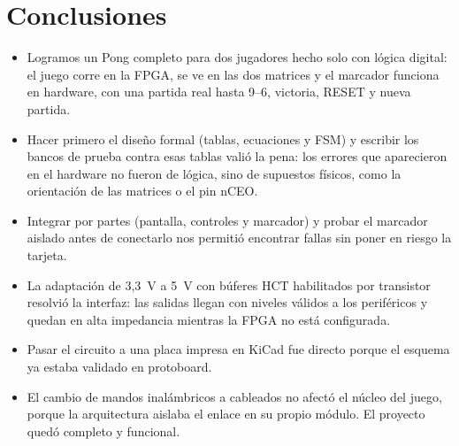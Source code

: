 \documentclass[conference,a4paper]{IEEEtran}
\begin{document}
\section{Conclusiones}

\begin{itemize}
\item Logramos un Pong completo para dos jugadores hecho solo con lógica digital: el juego corre en la FPGA, se ve en las dos matrices y el marcador funciona en hardware, con una partida real hasta 9--6, victoria, RESET y nueva partida.
\item Hacer primero el diseño formal (tablas, ecuaciones y FSM) y escribir los bancos de prueba contra esas tablas valió la pena: los errores que aparecieron en el hardware no fueron de lógica, sino de supuestos físicos, como la orientación de las matrices o el pin nCEO.
\item Integrar por partes (pantalla, controles y marcador) y probar el marcador aislado antes de conectarlo nos permitió encontrar fallas sin poner en riesgo la tarjeta.
\item La adaptación de 3,3~V a 5~V con búferes HCT habilitados por transistor resolvió la interfaz: las salidas llegan con niveles válidos a los periféricos y quedan en alta impedancia mientras la FPGA no está configurada.
\item Pasar el circuito a una placa impresa en KiCad fue directo porque el esquema ya estaba validado en protoboard.
\item El cambio de mandos inalámbricos a cableados no afectó el núcleo del juego, porque la arquitectura aislaba el enlace en su propio módulo. El proyecto quedó completo y funcional.
\end{itemize}
\end{document}

